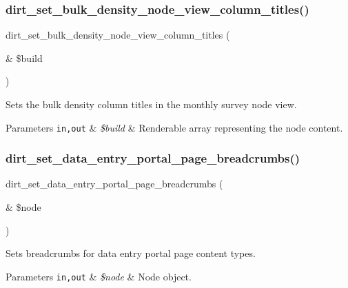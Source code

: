 \subsubsection{\texorpdfstring{dirt\+\_\+set\+\_\+bulk\+\_\+density\+\_\+node\+\_\+view\+\_\+column\+\_\+titles()}{dirt\_set\_bulk\_density\_node\_view\_column\_titles()}}
{\footnotesize\ttfamily dirt\+\_\+set\+\_\+bulk\+\_\+density\+\_\+node\+\_\+view\+\_\+column\+\_\+titles (\begin{DoxyParamCaption}\item[{\&}]{\$build }\end{DoxyParamCaption})}

Sets the bulk density column titles in the monthly survey node view.


\begin{DoxyParams}[1]{Parameters}
\mbox{\tt in,out}  & {\em \$build} & Renderable array representing the node content. \\
\hline
\end{DoxyParams}
\mbox{\label{dirt_8nodes_8inc_afe9e72362dff7c79e38ba49e5dba000e}} 
\subsubsection{\texorpdfstring{dirt\+\_\+set\+\_\+data\+\_\+entry\+\_\+portal\+\_\+page\+\_\+breadcrumbs()}{dirt\_set\_data\_entry\_portal\_page\_breadcrumbs()}}
{\footnotesize\ttfamily dirt\+\_\+set\+\_\+data\+\_\+entry\+\_\+portal\+\_\+page\+\_\+breadcrumbs (\begin{DoxyParamCaption}\item[{\&}]{\$node }\end{DoxyParamCaption})}

Sets breadcrumbs for data entry portal page content types.


\begin{DoxyParams}[1]{Parameters}
\mbox{\tt in,out}  & {\em \$node} & Node object. \\
\hline
\end{DoxyParams}
\mbox{\label{dirt_8nodes_8inc_aa974b5cea01ee587230f557ead98ca04}} 
